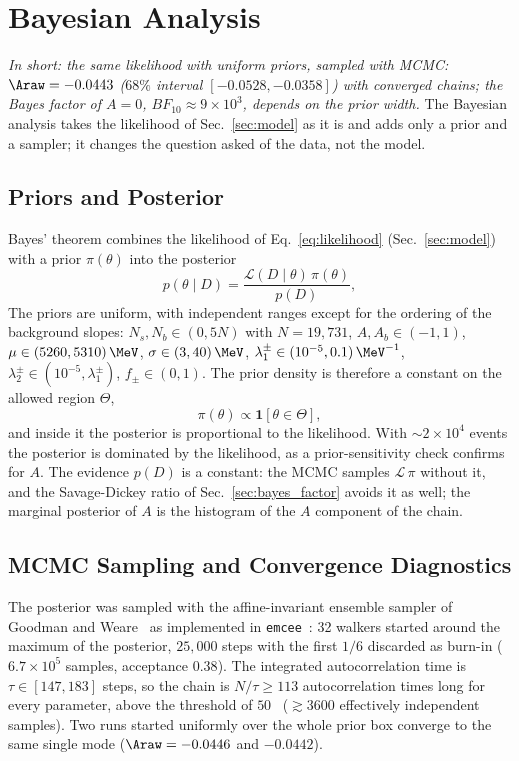 \section{Bayesian Analysis}
\label{sec:bayesian}
\emph{In short: the same likelihood with uniform priors, sampled with MCMC: $\Araw=-0.0443$ ($68\%$ interval $[-0.0528,-0.0358]$) with converged chains; the Bayes factor of $A=0$, $BF_{10}\approx9\times10^3$, depends on the prior width.}
The Bayesian analysis takes the likelihood of Sec.~\ref{sec:model} as it is and adds only a prior and a sampler; it changes the question asked of the data, not the model.

\subsection{Priors and Posterior}
\label{sec:bayes_prior}
Bayes' theorem combines the likelihood of Eq.~\eqref{eq:likelihood} (Sec.~\ref{sec:model}) with a prior $\pi(\theta)$ into the posterior
\begin{equation}
p(\theta\mid D)=\frac{\mathcal{L}(D\mid\theta)\,\pi(\theta)}{p(D)},
\label{eq:bayes}
\end{equation}
The priors are uniform, with independent ranges except for the ordering of the background slopes: $N_s,N_b\in(0,5N)$ with $N=19{,}731$, $A,A_b\in(-1,1)$, $\mu\in(5260,5310)\,\MeV$, $\sigma\in(3,40)\,\MeV$, $\lambda_1^{\pm}\in(10^{-5},0.1)\,\MeV^{-1}$, $\lambda_2^{\pm}\in(10^{-5},\lambda_1^{\pm})$, $f_{\pm}\in(0,1)$. The prior density is therefore a constant on the allowed region $\Theta$,
\begin{equation}
\pi(\theta)\propto\mathbf{1}\left[\theta\in\Theta\right],
\label{eq:prior}
\end{equation}
and inside it the posterior is proportional to the likelihood. With $\sim$$2\times10^4$ events the posterior is dominated by the likelihood, as a prior-sensitivity check confirms for $A$. The evidence $p(D)$ is a constant: the MCMC samples $\mathcal{L}\,\pi$ without it, and the Savage-Dickey ratio of Sec.~\ref{sec:bayes_factor} avoids it as well; the marginal posterior of $A$ is the histogram of the $A$ component of the chain.

\subsection{MCMC Sampling and Convergence Diagnostics}
\label{sec:bayes_mcmc}
The posterior was sampled with the affine-invariant ensemble sampler of Goodman and Weare~\cite{goodman_weare} as implemented in \texttt{emcee}~\cite{emcee}: 32 walkers started around the maximum of the posterior, $25{,}000$ steps with the first $1/6$ discarded as burn-in ($6.7\times10^5$ samples, acceptance $0.38$). The integrated autocorrelation time is $\tau\in[147,183]$ steps, so the chain is $N/\tau\geq113$ autocorrelation times long for every parameter, above the threshold of $50$~\cite{emcee} ($\gtrsim3600$ effectively independent samples). Two runs started uniformly over the whole prior box converge to the same single mode ($\Araw=-0.0446$ and $-0.0442$).

